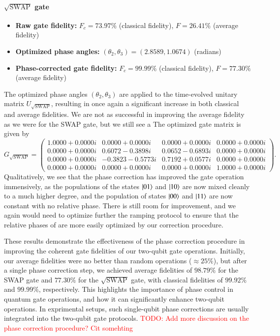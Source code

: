 \documentclass{subfiles}
\begin{document}
\paragraph{$\sqrt{\text{SWAP}}$ gate}
\begin{itemize}
    \item \textbf{Raw gate fidelity:} $F_c = 73.97\%$ (classical fidelity), $F = 26.41\%$ (average fidelity)
    \item \textbf{Optimized phase angles:} $(\theta_2, \theta_3) = (2.8589, 1.0674)$ (radians)
    \item \textbf{Phase-corrected gate fidelity:} $F_c = 99.99\%$ (classical fidelity), $F = 77.30\%$ (average fidelity)
\end{itemize}
The optimized phase angles $(\theta_2, \theta_3)$ are applied to the time-evolved unitary matrix $U_{\sqrt{\text{SWAP}}}$, resulting in once again a significant increase in both classical and average fidelities. We are not as successful in improving the average fidelity as we were for the SWAP gate, but we still see a
The optimized gate matrix is given by
\begin{equation}
G_{\sqrt{\mathrm{SWAP}}}
=
\begin{pmatrix}
 1.0000 + 0.0000i & 0.0000 + 0.0000i & 0.0000 + 0.0000i & 0.0000 + 0.0000i\\
 0.0000 + 0.0000i & 0.6072 - 0.3898i & 0.0652 - 0.6893i & 0.0000 + 0.0000i\\
 0.0000 + 0.0000i & -0.3823 - 0.5773i & 0.7192 + 0.0577i & 0.0000 + 0.0000i\\
 0.0000 + 0.0000i & 0.0000 + 0.0000i & 0.0000 + 0.0000i & 1.0000 + 0.0000i
\end{pmatrix}.
\end{equation}
Qualitatively, we see that the phase correction has improved the gate operation immensively, as the populations of the states $\ket{01}$ and $\ket{10}$ are now mixed cleanly to a much higher degree, and the population of states $\ket{00}$ and $\ket{11}$ are now constant with no relative phase. There is still room for improvement, and we again would need to optimize further the ramping protocol to ensure that the relative phases of are more easily optimized by our correction procedure.

These results demonstrate the effectiveness of the phase correction procedure in improving the coherent gate fidelities of our two-qubit gate operations. Initially, our average fidelities were no better than random operations ($\approx 25\%$), but after a single phase correction step, we achieved average fidelities of $98.79\%$ for the SWAP gate and $77.30\%$ for the $\sqrt{\text{SWAP}}$ gate, with classical fidelities of $99.92\%$ and $99.99\%$, respectively. This highlights the importance of phase control in quantum gate operations, and how it can significantly enhance two-qubit operations. In exprimental setups, such single-qubit phase corrections are usually integrated into the two-qubit gate protocols.
\textcolor{red}{TODO: Add more discussion on the phase correction procedure? Cit somehting}
\end{document}
